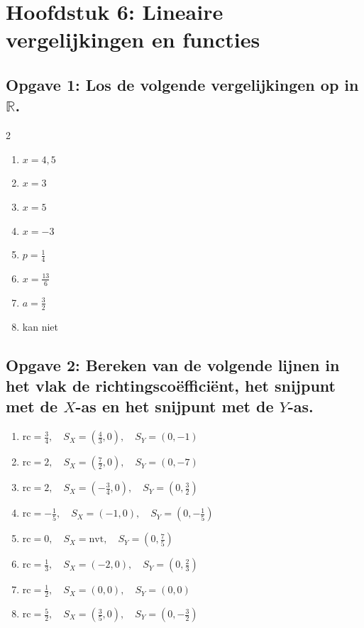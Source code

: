 \newpage
\section{Hoofdstuk 6: Lineaire vergelijkingen en functies}
\subsection*{Opgave 1: Los de volgende vergelijkingen op in $\mathbb{R}$.}
\begin{multicols}{2}
\begin{enumerate}[label=\alph*)]
    \item $x = 4{,}5$
    \item $x = 3$
    \item $x = 5$
    \item $x = -3$
    \item $p = \frac{1}{4}$
    \item $x = \frac{13}{6}$
    \item $a = \frac{3}{2}$
    \item kan niet
\end{enumerate}
\end{multicols}

\subsection*{Opgave 2: Bereken van de volgende lijnen in het vlak de richtingsco\"effici\"ent, het snijpunt met de $X$-as en het snijpunt met de $Y$-as.}
\begin{enumerate}[label=\alph*)]
    \item $\text{rc} = \frac{3}{4}, \quad S_X = \left(\frac{4}{3}, 0\right), \quad S_Y = (0, -1)$
    \item $\text{rc} = 2, \quad S_X = \left(\frac{7}{2}, 0\right), \quad S_Y = (0, -7)$
    \item $\text{rc} = 2, \quad S_X = \left(-\frac{3}{4}, 0\right), \quad S_Y = \left(0, \frac{3}{2}\right)$
    \item $\text{rc} = -\frac{1}{5}, \quad S_X = (-1, 0), \quad S_Y = \left(0, -\frac{1}{5}\right)$
    \item $\text{rc} = 0, \quad S_X = \text{nvt}, \quad S_Y = \left(0, \frac{7}{5}\right)$
    \item $\text{rc} = \frac{1}{3}, \quad S_X = (-2, 0), \quad S_Y = \left(0, \frac{2}{3}\right)$
    \item $\text{rc} = \frac{1}{2}, \quad S_X = (0, 0), \quad S_Y = (0, 0)$
    \item $\text{rc} = \frac{5}{2}, \quad S_X = \left(\frac{3}{5}, 0\right), \quad S_Y = \left(0, -\frac{3}{2}\right)$
\end{enumerate}

